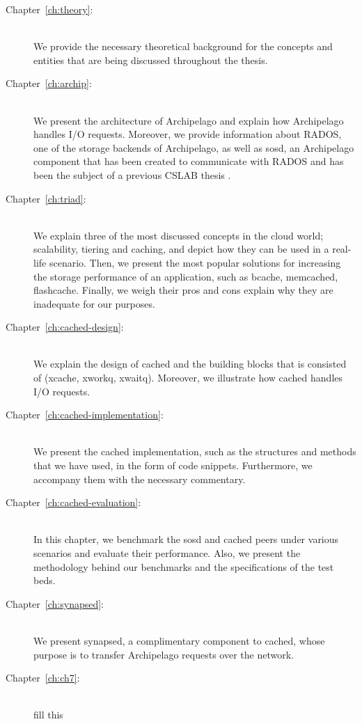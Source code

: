 \begin{description}
\item[Chapter~\ref{ch:theory}:] \hfill \\
	We provide the necessary theoretical background for the concepts and 
	entities that are being discussed throughout the thesis.
\item[Chapter~\ref{ch:archip}:] \hfill \\
	We present the architecture of Archipelago and explain how Archipelago 
	handles I/O requests. Moreover, we provide information about RADOS, one 
	of the storage backends of Archipelago, as well as sosd, an Archipelago 
	component that has been created to communicate with RADOS and has been 
	the subject of a previous CSLAB thesis \cite{philipgian}.
\item[Chapter~\ref{ch:triad}:] \hfill \\
	We explain three of the most discussed concepts in the cloud world; 
	scalability, tiering and caching, and depict how they can be used in a 
	real-life scenario. Then, we present the most popular solutions for 
	increasing the storage performance of an application, such as bcache, 
	memcached, flashcache. Finally, we weigh their pros and cons explain 
	why they are inadequate for our purposes.
\item[Chapter~\ref{ch:cached-design}:] \hfill \\
	We explain the design of cached and the building blocks that is 
	consisted of (xcache, xworkq, xwaitq). Moreover, we illustrate how 
	cached handles I/O requests.
\item[Chapter~\ref{ch:cached-implementation}:] \hfill \\
	We present the cached implementation, such as the structures and 
	methods that we have used, in the form of code snippets. Furthermore, 
	we accompany them with the necessary commentary.
\item[Chapter~\ref{ch:cached-evaluation}:] \hfill \\
	In this chapter, we benchmark the sosd and cached peers under various 
	scenarios and evaluate their performance. Also, we present the 
	methodology behind our benchmarks and the specifications of the test 
	beds.
\item[Chapter~\ref{ch:synapsed}:] \hfill \\
	We present synapsed, a complimentary component to cached, whose purpose 
	is to transfer Archipelago requests over the network.
\item[Chapter~\ref{ch:ch7}:] \hfill \\
	\todo fill this
\end{description}
